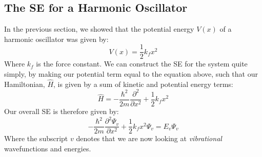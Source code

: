 \documentclass{memoir}[11pt,oneside,a4paper,openany]
\newcommand{\wf}{\ensuremath{\Psi}\xspace}
\begin{document}


\subsection{The SE for a Harmonic Oscillator}
In the previous section, we showed that the potential energy $V(x)$ of a harmonic oscillator was given by:
\begin{equation}
	V(x) = \frac{1}{2} k_fx^2
\end{equation}
Where $k_f$ is the force constant. We can construct the SE for the system quite simply, by making our potential term equal to the equation above, such that our Hamiltonian, $\hat{H}$, is given by a sum of kinetic and potential energy terms:
\begin{equation}
	\hat{H} = -\frac{\hbar^2}{2m}\frac{\partial^2}{\partial x^2} + \frac{1}{2}k_fx^2
\end{equation}
Our overall SE is therefore given by:
\begin{equation}\label{eq:vibrational_SE}
	-\frac{\hbar^2}{2m}\frac{\partial^2\wf_v}{\partial x^2} + \frac{1}{2}k_fx^2\wf_v = E_v\wf_v
\end{equation}
Where the subscript $v$ denotes that we are now looking at \emph{vibrational} wavefunctions and energies.
\end{document}
